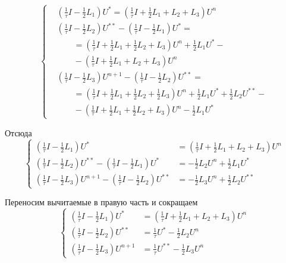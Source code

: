 \documentclass[a4paper,12pt]{article}
\begin{document}
\begin{equation*}
  \begin{cases}
      &\left( \frac{1}{\tau} I - \frac{1}{2} L_1 \right) U^{*} =
      \left( \frac{1}{\tau} I + \frac{1}{2} L_1 +  L_2 + L_3 \right) U^n \\
      &\left( \frac{1}{\tau} I - \frac{1}{2} L_2 \right) U^{**} -
      \left( \frac{1}{\tau} I - \frac{1}{2} L_1 \right) U^{*} = \\
      & \qquad = \left( \frac{1}{\tau} I + \frac{1}{2} L_1 + \frac{1}{2} L_2 + L_3 \right) U^n + \frac{1}{2} L_1 U^{*} - \\
      & \qquad - \left( \frac{1}{\tau} I + \frac{1}{2} L_1 +  L_2 + L_3 \right) U^n \\
      &\left( \frac{1}{\tau} I - \frac{1}{2} L_3 \right) U^{n+1} -
      \left( \frac{1}{\tau} I - \frac{1}{2} L_2 \right) U^{**} = \\
      & \qquad = \left( \frac{1}{\tau} I + \frac{1}{2} L_1 + \frac{1}{2} L_2 + \frac{1}{2} L_3 \right) U^n + \frac{1}{2} L_1 U^{*}   + \frac{1}{2} L_2 U^{**} - \\
      & \qquad - \left( \frac{1}{\tau} I + \frac{1}{2} L_1 + \frac{1}{2} L_2 + L_3 \right) U^n - \frac{1}{2} L_1 U^{*}
  \end{cases}
\end{equation*}

Отсюда
\begin{equation*}
  \begin{cases}
      \left( \frac{1}{\tau} I - \frac{1}{2} L_1 \right) U^{*} &=
      \left( \frac{1}{\tau} I + \frac{1}{2} L_1 +  L_2 + L_3 \right) U^n \\
      \left( \frac{1}{\tau} I - \frac{1}{2} L_2 \right) U^{**} -
      \left( \frac{1}{\tau} I - \frac{1}{2} L_1 \right) U^{*} &= - \frac{1}{2} L_2 U^n + \frac{1}{2} L_1 U^{*} \\
      \left( \frac{1}{\tau} I - \frac{1}{2} L_3 \right) U^{n+1} -
      \left( \frac{1}{\tau} I - \frac{1}{2} L_2 \right) U^{**} &= - \frac{1}{2} L_3 U^n + \frac{1}{2} L_2 U^{**}
  \end{cases}
\end{equation*}

Переносим вычитаемые в правую часть и сокращаем
\begin{equation*}
  \begin{cases}
      \left( \frac{1}{\tau} I - \frac{1}{2} L_1 \right) U^{*} &=
      \left( \frac{1}{\tau} I + \frac{1}{2} L_1 +  L_2 + L_3 \right) U^n \\
      \left( \frac{1}{\tau} I - \frac{1}{2} L_2 \right) U^{**} & =
      \frac{1}{\tau} U^{*} - \frac{1}{2} L_2 U^n \\
      \left( \frac{1}{\tau} I - \frac{1}{2} L_3 \right) U^{n+1} & =
      \frac{1}{\tau} U^{**} - \frac{1}{2} L_3 U^n
  \end{cases}
\end{equation*}
\end{document}
